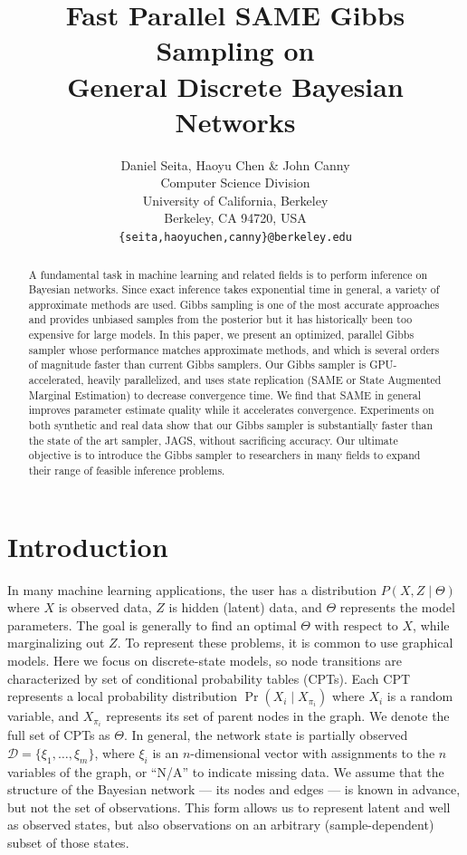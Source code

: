\documentclass{article} %
\title{Fast Parallel SAME Gibbs Sampling on \\ General Discrete Bayesian Networks}
\author{Daniel Seita, Haoyu Chen \& John Canny \\
Computer Science Division \\
University of California, Berkeley \\
Berkeley, CA 94720, USA \\
\texttt{\{seita,haoyuchen,canny\}@berkeley.edu}
}
\begin{document}
\maketitle

\begin{abstract}
A fundamental task in machine learning and related fields is to
perform inference on Bayesian networks. Since exact inference takes
exponential time in general, a variety of approximate methods are
used.  Gibbs sampling is one of the most accurate approaches and
provides unbiased samples from the posterior but it has historically
been too expensive for large models. In this paper, we present an
optimized, parallel Gibbs sampler whose performance matches
approximate methods, and which is several orders of magnitude faster
than current Gibbs samplers.  Our Gibbs sampler is GPU-accelerated,
heavily parallelized, and uses state replication (SAME or State
Augmented Marginal Estimation) to decrease convergence time. We find
that SAME in general improves parameter estimate quality while it
accelerates convergence.  Experiments on both synthetic and real data
show that our Gibbs sampler is substantially faster than the state of
the art sampler, JAGS, without sacrificing accuracy. Our ultimate
objective is to introduce the Gibbs sampler to researchers in many
fields to expand their range of feasible inference problems.
\end{abstract}




\section{Introduction}\label{sec:intro}

In many machine learning applications, the user has a distribution
$P(X,Z \mid \Theta)$ where $X$ is observed data, $Z$ is hidden
(latent) data, and $\Theta$ represents the model parameters. The goal
is generally to find an optimal $\Theta$ with respect to $X$, while
marginalizing out $Z$. To represent these problems, it is common to
use graphical models.  Here we focus on discrete-state models,
so node transitions are characterized by set of conditional
probability tables (CPTs). Each CPT represents a local probability
distribution $\Pr(X_i \mid X_{\pi_i})$ where $X_i$ is a random
variable, and $X_{\pi_i}$ represents its set of parent nodes in the
graph. We denote the full set of CPTs as $\Theta$.  In general, the
network state is partially observed $\mathcal{D} = \{\xi_1, \ldots,
\xi_m\}$, where $\xi_i$ is an $n$-dimensional vector with assignments
to the $n$ variables of the graph, or ``N/A'' to indicate missing
data. We assume that the structure of the Bayesian network --- its
nodes and edges --- is known in advance, but not the set of
observations. This form allows us to represent latent and well as
observed states, but also observations on an arbitrary
(sample-dependent) subset of those states.
\end{document}
